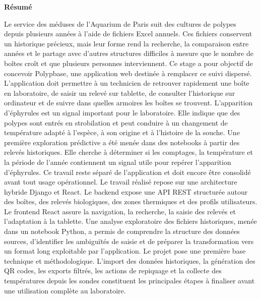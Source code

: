 \documentclass{article}
\begin{document}
\newpage
\hypersetup{pageanchor=true}
\setcounter{page}{1}
\tableofcontents

\newpage
\thispagestyle{empty}
\vspace*{1.5cm}
\begin{center}
{\Large \textbf{Résumé}}
\end{center}

\vspace{0.8cm}

Le service des méduses de l'Aquarium de Paris suit des cultures de polypes depuis plusieurs années à l'aide de fichiers Excel annuels. Ces fichiers conservent un historique précieux, mais leur forme rend la recherche, la comparaison entre années et le partage avec d'autres structures difficiles à mesure que le nombre de boîtes croît et que plusieurs personnes interviennent.
Ce stage a pour objectif de concevoir Polypbase, une application web destinée à remplacer ce suivi dispersé. L'application doit permettre à un technicien de retrouver rapidement une boîte en laboratoire, de saisir un relevé sur tablette, de consulter l'historique sur ordinateur et de suivre dans quelles armoires les boîtes se trouvent. L'apparition d'éphyrules est un signal important pour le laboratoire. Elle indique que des polypes sont entrés en strobilation et peut conduire à un changement de température adapté à l'espèce, à son origine et à l'histoire de la souche. Une première exploration prédictive a été menée dans des notebooks à partir des relevés historiques. Elle cherche à déterminer si les comptages, la température et la période de l'année contiennent un signal utile pour repérer l'apparition d'éphyrules. Ce travail reste séparé de l'application et doit encore être consolidé avant tout usage opérationnel.
Le travail réalisé repose sur une architecture hybride Django et React. Le backend expose une API REST structurée autour des boîtes, des relevés biologiques, des zones thermiques et des profils utilisateurs.
Le frontend React assure la navigation, la recherche, la saisie des relevés et l'adaptation à la tablette. Une analyse exploratoire des fichiers historiques, menée dans un notebook Python, a permis de comprendre la structure des données sources, d'identifier les ambiguïtés de saisie et de préparer la transformation vers un format long exploitable par l'application.
Le projet pose une première base technique et méthodologique. L'import des données historiques, la génération des QR codes, les exports filtrés, les actions de repiquage et la collecte des températures depuis les sondes constituent les principales étapes à finaliser avant une utilisation complète au laboratoire.
\end{document}
